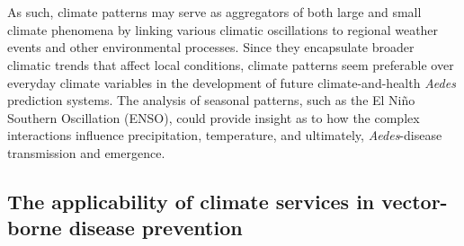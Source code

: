 \documentclass[10pt,twocolumn]{wlscirep}
\begin{document}
\\
\\
As such, climate patterns may serve as aggregators of both large and small climate phenomena by linking various climatic oscillations to regional weather events and other environmental processes\cite{lee_2018}. Since they encapsulate broader climatic trends that affect local conditions, climate patterns seem preferable over everyday climate variables in the development of future climate-and-health \textit{Aedes} prediction systems\cite{easterbrook_2016, hallett_2004}. The analysis of seasonal patterns, such as the El Niño Southern Oscillation (ENSO), could provide insight as to how the complex interactions influence precipitation, temperature, and ultimately, \textit{Aedes}-disease transmission and emergence.

\subsection{The applicability of climate services in vector-borne disease prevention} \label{sec-climate-services}
\end{document}
